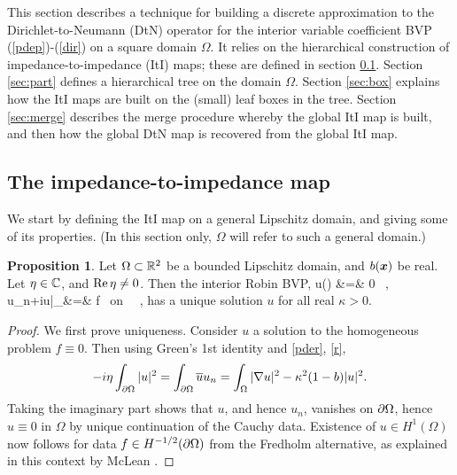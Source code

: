 \documentclass[11pt,final]{amsart}
\theoremstyle{definition}
\numberwithin{remark}{section}
\numberwithin{definition}{section}
\newtheorem{pro}{Proposition}
\numberwithin{pro}{section}
\begin{document}
This section describes a technique for building a discrete approximation to the Dirichlet-to-Neumann
(DtN) operator for the interior variable coefficient BVP (\ref{pdep})-(\ref{dir}) on a square
domain $\Omega$. It relies on the
hierarchical construction of impedance-to-impedance (ItI) maps; these are defined in section \ref{sec:iti}.
Section \ref{sec:part} defines a hierarchical tree on the domain $\Omega$.
Section \ref{sec:box} explains how the ItI maps are built on the (small) leaf boxes in the tree.
Section \ref{sec:merge} describes the merge procedure whereby the global ItI map is built,
and then how the global DtN map is recovered from the global ItI map.


\subsection{The impedance-to-impedance map}
\label{sec:iti}

We start by defining the ItI map on a general Lipschitz domain, and
giving some of its properties. (In this section only, $\Omega$ will
refer to such a general domain.)

\begin{pro}
Let $\Omega\subset\mathbb{R}^2$ be a bounded Lipschitz domain, and $b(\bm{x})$ be real.
Let $\eta\in\mathbb{C}$, and $\operatorname{Re} \eta\neq 0$. Then the interior Robin BVP,
u(\xx) &=& 0 \qquad \xx \in \Omega~,
\label{pder}
\\
u_n+i\eta u|_\pO&=& f \qquad \mbox{ on } \pO~,
\label{r}
\eea
has a unique solution $u$ for all real $\kappa>0$.
\label{p:robin}
\end{pro}
\begin{proof}
We first prove uniqueness. Consider $u$ a solution to the homogeneous problem
$f\equiv 0$. Then
using Green's 1st identity and \eqref{pder}, \eqref{r},
$$-i\eta\int_{\partial\Omega} |u|^2 = \int_{\partial\Omega}\overline{u}u_n =\int_\Omega
|\nabla u|^2 - \kappa^2(1-b)|u|^2 .
$$
Taking the imaginary part shows that $u$, and hence $u_n$, vanishes on
${\partial\Omega}$, hence $u\equiv 0$ in $\Omega$ by unique continuation of the Cauchy data.
Existence of $u\in H^1(\Omega)$ now follows
for data $f\in H^{-1/2}({\partial\Omega})$ from the Fredholm alternative,
as explained in this context by McLean \cite[Thm.~4.11]{mclean2000}.
\end{proof}
\end{document}
